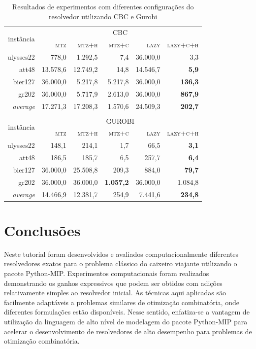 \documentclass[a4paper,11pt,fleqn]{article}
\begin{document}
\begin{table}
	\begin{center}		
\begin{tabular}{|r|r|r|r|r|r|}
\hline 
\multirow{2}{*}{instância} & \multicolumn{5}{c|}{CBC}\tabularnewline
\cline{2-6} \cline{3-6} \cline{4-6} \cline{5-6} \cline{6-6} 
 & \textsc{mtz} & \textsc{mtz+h} & \textsc{mtz+c} & \textsc{lazy} & \textsc{lazy+c+h}\tabularnewline
\hline 
\hline 
ulysses22 & 778,0 & 1.292,5 & 7,4 & \cellcolor{gray}36.000,0 & 3,3\tabularnewline
\hline 
att48 & 13.578,6 & 12.749,2 & 14,8 & 14.546,7 & \textbf{5,9}\tabularnewline
\hline 
bier127 & \cellcolor{gray}36.000,0 & 5.217,8 & 5.217,8 & \cellcolor{gray}36.000,0 & \textbf{136,3}\tabularnewline
\hline 
gr202 & \cellcolor{gray}36.000,0 & 5.717,9 & 2.613,0 & \cellcolor{gray}36.000,0 & \textbf{867,9}\tabularnewline
\hline 
\hline 
\emph{average} & 17.271,3 & 17.208,3 & 1.570,6 & 24.509,3 & \textbf{202,7}\tabularnewline
\hline 
\multicolumn{1}{r}{} & \multicolumn{1}{r}{} & \multicolumn{1}{r}{} & \multicolumn{1}{r}{} & \multicolumn{1}{r}{} & \multicolumn{1}{r}{}\tabularnewline
\hline 
\multirow{2}{*}{instância} & \multicolumn{5}{c|}{GUROBI}\tabularnewline
\cline{2-6} \cline{3-6} \cline{4-6} \cline{5-6} \cline{6-6} 
 & \textsc{mtz} & \textsc{mtz+h} & \textsc{mtz+c} & \textsc{lazy} & \textsc{lazy+c+h}\tabularnewline
\hline 
\hline 
ulysses22 & 148,1 & 214,1 & 1,7 & 66,5 & \textbf{3,1}\tabularnewline
\hline 
att48 & 186,5 & 185,7 & 6,5 & 257,7 & \textbf{6,4}\tabularnewline
\hline 
bier127 & \cellcolor{gray}36.000,0 & 25.508,8 & 209,3 & 884,0 & \textbf{79,7}\tabularnewline
\hline 
gr202 & \cellcolor{gray}36.000,0 & \cellcolor{gray}36.000,0 & \textbf{1.057,2} & 36.000,0 & 1.084,8\tabularnewline
\hline 
\hline 
\emph{average} & 14.466,9 & 12.381,7 & 254,9 & 7.441,6 & \textbf{234,8}\tabularnewline
\hline 
\end{tabular}
	\label{resExp} \caption{Resultados de experimentos com diferentes configurações do resolvedor utilizando CBC e Gurobi}
	\end{center}	
\end{table}

\section{Conclusões}

Neste tutorial foram desenvolvidos e avaliados computacionalmente diferentes resolvedores exatos para o problema clássico do caixeiro viajante utilizando o pacote Python-MIP. Experimentos computacionais foram realizados demonstrando os ganhos expressivos que podem ser obtidos com adições relativamente simples ao resolvedor inicial. As técnicas aqui aplicadas são facilmente adaptáveis a problemas similares de otimização combinatória, onde diferentes formulações estão disponíveis. Nesse sentido, enfatiza-se a vantagem de utilização da linguagem de alto nível de modelagem do pacote Python-MIP para acelerar o desenvolvimento de resolvedores de alto desempenho para problemas de otimização combinatória.



\end{document}
